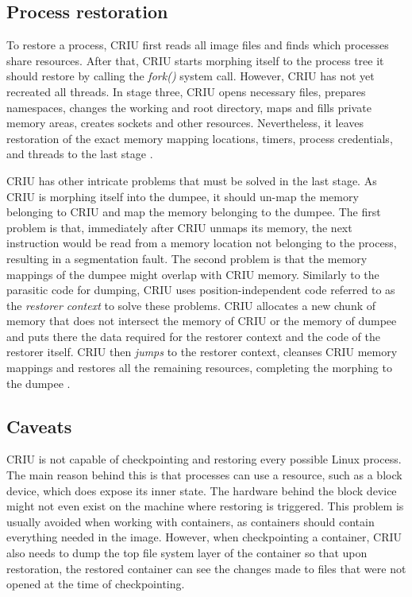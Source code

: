 \documentclass[
  digital,     %
  oneside,     %
  nosansbold,  %
  nocolorbold, %
  lof,         %
  nolot,         %
]{fithesis4}
\begin{document}
\subsection{Process restoration}
To restore a process, CRIU first reads all image files and finds which processes share resources. After that, CRIU starts morphing itself to the process tree it should restore by calling the \emph{fork()} system call. However, CRIU has not yet recreated all threads. In stage three, CRIU opens necessary files, prepares namespaces, changes the working and root directory, maps and fills private memory areas, creates sockets and other resources. Nevertheless, it leaves restoration of the exact memory mapping locations, timers, process credentials, and threads to the last stage \cite{criu_cr}.

CRIU has other intricate problems that must be solved in the last stage. As CRIU is morphing itself into the dumpee, it should un-map the memory belonging to CRIU and map the memory belonging to the dumpee. The first problem is that, immediately after CRIU unmaps its memory, the next instruction would be read from a memory location not belonging to the process, resulting in a segmentation fault. The second problem is that the memory mappings of the dumpee might overlap with CRIU memory. Similarly to the parasitic code for dumping, CRIU uses position-independent code referred to as the \emph{restorer context} to solve these problems. CRIU allocates a new chunk of memory that does not intersect the memory of CRIU or the memory of dumpee and puts there the data required for the restorer context and the code of the restorer itself. CRIU then \emph{jumps} to the restorer context, cleanses CRIU memory mappings and restores all the remaining resources, completing the morphing to the dumpee \cite{criu_restorer}.


\subsection{Caveats}
CRIU is not capable of checkpointing and restoring every possible Linux process. The main reason behind this is that processes can use a resource, such as a block device, which does expose its inner state. The hardware behind the block device might not even exist on the machine where restoring is triggered. This problem is usually avoided when working with containers, as containers should contain everything needed in the image. However, when checkpointing a container, CRIU also needs to dump the top file system layer of the container so that upon restoration, the restored container can see the changes made to files that were not opened at the time of checkpointing.
\end{document}

